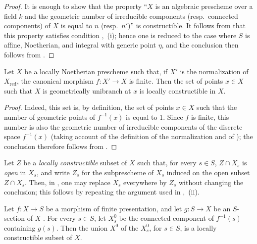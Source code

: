 \begin{proof}
It is enough to show that the property ``$X$ is an algebraic prescheme over a field $k$ and the geometric number of irreducible components (resp.\ connected components) of $X$ is equal to $n$ (resp.\ $n'$)'' is constructible. It follows from  that this property satisfies condition ,~(i); hence one is reduced to the case where $S$ is affine, Noetherian, and integral with generic point $\eta$, and the conclusion then follows from .
\end{proof}

\begin{corollary}[9.7.10]
\label{IV.9.7.10}
Let $X$ be a locally Noetherian prescheme such that, if $X'$ is the normalization of $X_{\mathrm{red}}$, the canonical morphism $f:X'\to X$ is finite. Then the set of points $x\in X$ such that $X$ is geometrically unibranch at $x$ is locally constructible in $X$.
\end{corollary}

\begin{proof}
Indeed, this set is, by definition, the set of points $x\in X$ such that the number of geometric points of $f^{-1}(x)$ is equal to $1$. Since $f$ is finite, this number is also the geometric number of irreducible components of the discrete space $f^{-1}(x)$ (taking account of the definition of the normalization  and of ); the conclusion therefore follows from .
\end{proof}

\begin{remark}[9.7.11]
\label{IV.9.7.11}
Let $Z$ be a \emph{locally constructible} subset of $X$ such that, for every $s\in S$, $Z\cap X_s$ is \emph{open} in $X_s$, and write $Z_s$ for the subprescheme of $X_s$ induced
on the open subset $Z\cap X_s$. Then, in , one may replace $X_s$ everywhere by $Z_s$ without changing the conclusion; this follows by repeating the argument used in ,~(ii).
\end{remark}

\begin{proposition}[9.7.12]
\label{IV.9.7.12}
Let $f:X\to S$ be a morphism of finite presentation, and let $g:S\to X$ be an $S$-section of $X$ . For every $s\in S$, let $X_s^0$ be the connected component of $f^{-1}(s)$ containing $g(s)$. Then the union $X^0$ of the $X_s^0$, for $s\in S$, is a locally constructible subset of $X$.
\end{proposition}

